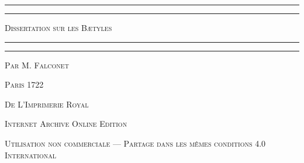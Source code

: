 \documentclass[a4paper, 11pt, oneside, polutonikogreek, french]{article}
\begin{document}
\begin{titlepage} %
	\centering %

	
	\rule{\textwidth}{1.6pt}\vspace*{-\baselineskip}\vspace*{2pt} %
	\rule{\textwidth}{0.4pt} %
	
	\vspace{1\baselineskip} %
	
	{\scshape\Huge Dissertation sur les Bætyles}
	
	\vspace{1\baselineskip} %

	\rule{\textwidth}{0.4pt}\vspace*{-\baselineskip}\vspace{3.2pt} %
	\rule{\textwidth}{1.6pt} %
	
	\vspace{1\baselineskip} %
	
	
	{\scshape \Large Par M. Falconet} %
	
	\vspace*{1\baselineskip} %
	
        {\scshape\scriptsize } %
    
        \vspace*{\fill}

	\vspace{1\baselineskip}

	{\small\scshape Paris 1722}
	
	{\small\scshape{De L'Imprimerie Royal}}
	
	\vspace{0.5\baselineskip} %

        \scshape Internet Archive Online Edition  %
	
	{\scshape\small Utilisation non commerciale --- Partage dans les mêmes conditions 4.0 International} %
\end{titlepage}
\setlength{\parskip}{1mm plus1mm minus1mm}
\clearpage
\end{document}
